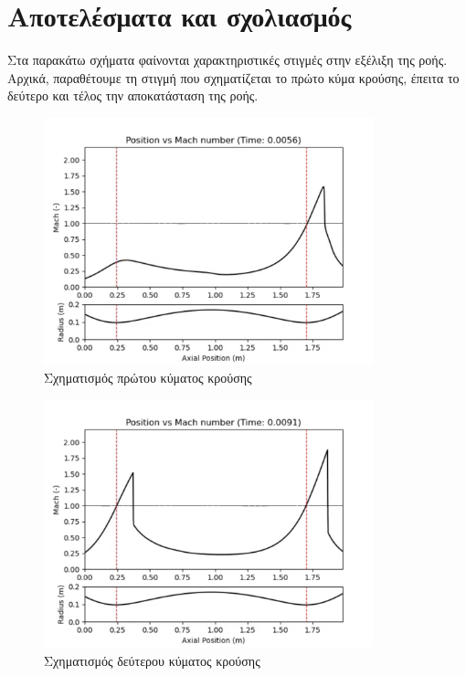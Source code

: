 \section{Αποτελέσματα και σχολιασμός}

Στα παρακάτω σχήματα φαίνονται χαρακτηριστικές στιγμές στην εξέλιξη της ροής. Αρχικά, παραθέτουμε τη στιγμή που σχηματίζεται το πρώτο κύμα κρούσης, έπειτα το δεύτερο και τέλος την αποκατάσταση της ροής.

\begin{figure}[h!]
    \begin{center}
        \includegraphics[width=0.85\textwidth]{figures/first_shock.png}
    \end{center}
    \caption{Σχηματισμός πρώτου κύματος κρούσης}
    \label{fig:firstshock}
\end{figure}

\begin{figure}[h!]
    \begin{center}
        \includegraphics[width=0.85\textwidth]{figures/second_shock.png}
    \end{center}
    \caption{Σχηματισμός δεύτερου κύματος κρούσης}
    \label{fig:secondshock}
\end{figure}

